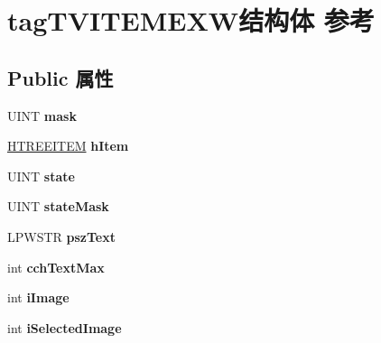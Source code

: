 \hypertarget{structtag_t_v_i_t_e_m_e_x_w}{}\section{tag\+T\+V\+I\+T\+E\+M\+E\+X\+W结构体 参考}
\label{structtag_t_v_i_t_e_m_e_x_w}
\subsection*{Public 属性}
\begin{DoxyCompactItemize}
\item 
\mbox{\label{structtag_t_v_i_t_e_m_e_x_w_a197a38931437bf01f77d08f8769c4dd9}} 
U\+I\+NT {\bfseries mask}
\item 
\mbox{\label{structtag_t_v_i_t_e_m_e_x_w_ae4b11d8bc70fde530f8c807cc9099972}} 
\hyperlink{struct___t_r_e_e_i_t_e_m}{H\+T\+R\+E\+E\+I\+T\+EM} {\bfseries h\+Item}
\item 
\mbox{\label{structtag_t_v_i_t_e_m_e_x_w_a098cb4f108cf54bbd58a81aa745d8ab5}} 
U\+I\+NT {\bfseries state}
\item 
\mbox{\label{structtag_t_v_i_t_e_m_e_x_w_a59197149bffdbf0d194b374940e212de}} 
U\+I\+NT {\bfseries state\+Mask}
\item 
\mbox{\label{structtag_t_v_i_t_e_m_e_x_w_a3f93d797f33d4475f549a5da456a5735}} 
L\+P\+W\+S\+TR {\bfseries psz\+Text}
\item 
\mbox{\label{structtag_t_v_i_t_e_m_e_x_w_a9cc5dd2ba848c2bb287e54b6c5e5e16a}} 
int {\bfseries cch\+Text\+Max}
\item 
\mbox{\label{structtag_t_v_i_t_e_m_e_x_w_a1c696ea953eb192047b6cc5bce633766}} 
int {\bfseries i\+Image}
\item 
\mbox{\label{structtag_t_v_i_t_e_m_e_x_w_a2bafe15777a0d05b166f48a8b3fa8628}} 
int {\bfseries i\+Selected\+Image}
\item 
\mbox{\label{structtag_t_v_i_t_e_m_e_x_w_aac3e3ed3c9a5b29fc475b2c90812c196}} 

\end{DoxyCompactItemize}
